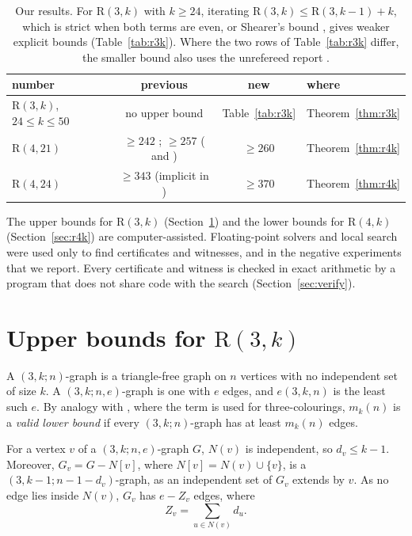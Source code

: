 \documentclass[11pt]{article}
\theoremstyle{spacedplain}
\theoremstyle{spaceddef}
\theoremstyle{spacedremark}
\newcommand{\R}{\mathrm{R}}
\begin{document}
\begin{table}[htbp]
\centering
\begin{tabular}{lccl}
\toprule
number & previous & new & where\\
\midrule
$\R(3,k)$, $24\le k\le 50$ & no upper bound \cite{Rad26} & Table~\ref{tab:r3k} & Theorem~\ref{thm:r3k}\\
$\R(4,21)$ & $\ge 242$ \cite{SLZL}; $\ge 257$ (\cite{Yu26} and \cite[2.3(e)]{Rad26}) & $\ge 260$ & Theorem~\ref{thm:r4k}\\
$\R(4,24)$ & $\ge 343$ (implicit in \cite{LinCa}) & $\ge 370$ & Theorem~\ref{thm:r4k}\\
\bottomrule
\end{tabular}
\caption{Our results.
For $\R(3,k)$ with $k\ge 24$, iterating $\R(3,k)\le\R(3,k-1)+k$, which is strict when both terms are even, or Shearer's bound \cite{Sh83}, gives weaker explicit bounds (Table~\ref{tab:r3k}).
Where the two rows of Table~\ref{tab:r3k} differ, the smaller bound also uses the unrefereed report \cite{Back3}.}
\label{tab:results}
\end{table}

The upper bounds for $\R(3,k)$ (Section~\ref{sec:r3k}) and the lower bounds for $\R(4,k)$ (Section~\ref{sec:r4k}) are computer-assisted.
Floating-point solvers and local search were used only to find certificates and witnesses, and in the negative experiments that we report.
Every certificate and witness is checked in exact arithmetic by a program that does not share code with the search (Section~\ref{sec:verify}).

\section{Upper bounds for \texorpdfstring{$\R(3,k)$}{R(3,k)}}\label{sec:r3k}

A $(3,k;n)$-graph is a triangle-free graph on $n$ vertices with no independent set of size $k$.
A $(3,k;n,e)$-graph is one with $e$ edges, and $e(3,k,n)$ is the least such $e$.
By analogy with \cite[Section~3]{DC26}, where the term is used for three-colourings, $m_k(n)$ is a \emph{valid lower bound} if every $(3,k;n)$-graph has at least $m_k(n)$ edges.

For a vertex $v$ of a $(3,k;n,e)$-graph $G$, $N(v)$ is independent, so $d_v\le k-1$.
Moreover, $G_v=G-N[v]$, where $N[v]=N(v)\cup\{v\}$, is a $(3,k-1;n-1-d_v)$-graph, as an independent set of $G_v$ extends by $v$.
As no edge lies inside $N(v)$, $G_v$ has $e-Z_v$ edges, where
\[
Z_v=\sum_{u\in N(v)}d_u .
\]
\end{document}
